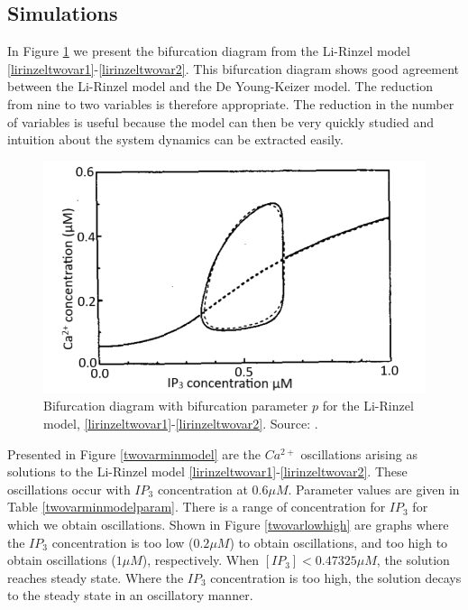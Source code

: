 \subsection{Simulations}
In Figure \ref{lirinzelbif} we present the bifurcation diagram from the Li-Rinzel model \eqref{lirinzeltwovar1}-\eqref{lirinzeltwovar2}. This bifurcation diagram shows good agreement between the Li-Rinzel model and the De Young-Keizer model. The reduction from nine to two variables is therefore appropriate. {The reduction in the number of variables is useful because the model can then be very quickly studied and intuition about the system dynamics can be extracted easily}.

\begin{figure}[h!!!t!!!b!!!p]
  \centering
  \includegraphics[width=0.8\linewidth]{Chapters/2_Ca2+_Models/extras/lirinzelbif.png}
  \caption{Bifurcation diagram with bifurcation parameter $p$ for the Li-Rinzel model, \eqref{lirinzeltwovar1}-\eqref{lirinzeltwovar2}. Source: . }\label{lirinzelbif}
\end{figure}

Presented in Figure \ref{twovarminmodel} are the $Ca^{2+}$ oscillations arising as solutions to the Li-Rinzel model \eqref{lirinzeltwovar1}-\eqref{lirinzeltwovar2}. These oscillations occur with $IP_3$ concentration at $0.6 \mu M$. Parameter values are given in Table \ref{twovarminmodelparam}. There is a range of concentration for $IP_3$ for which we obtain oscillations. Shown in Figure \ref{twovarlowhigh} are graphs where the $IP_3$ concentration is too low ($0.2 \mu M$) to obtain oscillations, and too high to obtain oscillations ($1 \mu M$), respectively. {When $[IP_3]<0.47325 \mu M$,} the solution reaches steady state. Where the $IP_3$ concentration is too high, the solution decays to the steady state in an oscillatory manner. 

